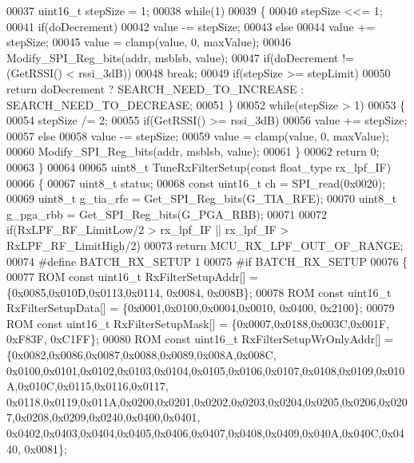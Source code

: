 \begin{DoxyCode}
00037     uint16\_t stepSize = 1;
00038     \textcolor{keywordflow}{while}(1)
00039     \{
00040         stepSize <<= 1;
00041         \textcolor{keywordflow}{if}(doDecrement)
00042             value -= stepSize;
00043         \textcolor{keywordflow}{else}
00044             value += stepSize;
00045         value = clamp(value, 0, maxValue);
00046         Modify_SPI_Reg_bits(addr, msblsb, value);
00047         \textcolor{keywordflow}{if}(doDecrement != (GetRSSI() < rssi\_3dB))
00048             \textcolor{keywordflow}{break};
00049         \textcolor{keywordflow}{if}(stepSize >= stepLimit)
00050             \textcolor{keywordflow}{return} doDecrement ? SEARCH_NEED_TO_INCREASE : 
      SEARCH_NEED_TO_DECREASE;
00051     \}
00052     \textcolor{keywordflow}{while}(stepSize > 1)
00053     \{
00054         stepSize /= 2;
00055         \textcolor{keywordflow}{if}(GetRSSI() >= rssi\_3dB)
00056             value += stepSize;
00057         \textcolor{keywordflow}{else}
00058             value -= stepSize;
00059         value = clamp(value, 0, maxValue);
00060         Modify_SPI_Reg_bits(addr, msblsb, value);
00061     \}
00062     \textcolor{keywordflow}{return} 0;
00063 \}
00064 
00065 uint8\_t TuneRxFilterSetup(\textcolor{keyword}{const} float_type rx\_lpf\_IF)
00066 \{
00067     uint8\_t status;
00068     \textcolor{keyword}{const} uint16\_t ch = SPI_read(0x0020);
00069     uint8\_t g\_tia\_rfe = Get_SPI_Reg_bits(G_TIA_RFE);
00070     uint8\_t g\_pga\_rbb = Get_SPI_Reg_bits(G_PGA_RBB);
00071 
00072     \textcolor{keywordflow}{if}(RxLPF_RF_LimitLow/2 > rx\_lpf\_IF || rx\_lpf\_IF > RxLPF_RF_LimitHigh/2)
00073         \textcolor{keywordflow}{return} MCU_RX_LPF_OUT_OF_RANGE;
00074 \textcolor{preprocessor}{#define BATCH\_RX\_SETUP 1}
00075 \textcolor{preprocessor}{#if BATCH\_RX\_SETUP}
00076     \{
00077         ROM \textcolor{keyword}{const} uint16\_t RxFilterSetupAddr[] = \{0x0085,0x010D,0x0113,0x0114, 0x0084, 0x008B\};
00078         ROM \textcolor{keyword}{const} uint16\_t RxFilterSetupData[] = \{0x0001,0x0100,0x0004,0x0010, 0x0400, 0x2100\};
00079         ROM \textcolor{keyword}{const} uint16\_t RxFilterSetupMask[] = \{0x0007,0x0188,0x003C,0x001F, 0xF83F, 0xC1FF\};
00080         ROM \textcolor{keyword}{const} uint16\_t RxFilterSetupWrOnlyAddr[] = \{0x0082,0x0086,0x0087,0x0088,0x0089,0x008A,0x008C,
      0x0100,0x0101,0x0102,0x0103,0x0104,0x0105,0x0106,0x0107,0x0108,0x0109,0x010A,0x010C,0x0115,0x0116,0x0117,
      0x0118,0x0119,0x011A,0x0200,0x0201,0x0202,0x0203,0x0204,0x0205,0x0206,0x0207,0x0208,0x0209,0x0240,0x0400,0x0401,
      0x0402,0x0403,0x0404,0x0405,0x0406,0x0407,0x0408,0x0409,0x040A,0x040C,0x0440, 0x0081\};

\end{DoxyCode}
